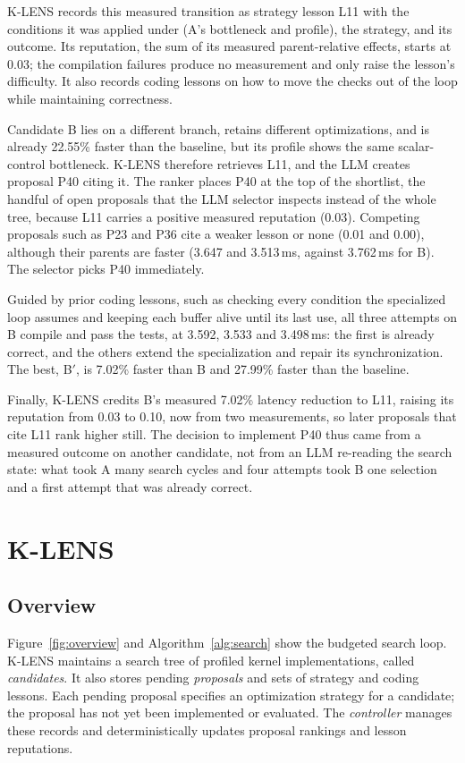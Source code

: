 \documentclass[acmsmall,screen,review,anonymous,nonacm]{acmart}
\newcommand{\klens}{\textsc{K-LENS}\xspace}
\begin{document}
\klens records this measured transition as strategy lesson L11 with the conditions it was applied under (A's
bottleneck and profile), the strategy, and its outcome. Its reputation, the sum of its measured parent-relative effects,
starts at 0.03; the compilation failures produce no measurement and only raise
the lesson's difficulty. It also records coding lessons on how to move the
checks out of the loop while maintaining correctness.

Candidate B lies on a different branch, retains different optimizations, and is
already 22.55\% faster than the baseline, but its profile shows the same
scalar-control bottleneck. \klens therefore retrieves L11, and the LLM creates
proposal P40 citing it. The ranker places P40 at the top of the shortlist, the
handful of open proposals that the LLM selector inspects instead of the whole
tree, because L11 carries a positive measured reputation (0.03). Competing
proposals such as P23 and P36 cite a weaker lesson or none (0.01 and 0.00),
although their parents are faster (3.647 and 3.513\,ms, against 3.762\,ms for
B). The selector picks P40 immediately.

Guided by prior coding lessons, such as checking every condition the
specialized loop assumes and keeping each buffer alive until its last use, all
three attempts on B compile and pass the tests, at 3.592, 3.533 and
3.498\,ms: the first is already correct, and the others extend the
specialization and repair its synchronization. The best, B$'$, is 7.02\%
faster than B and 27.99\% faster than the baseline.

Finally, \klens credits B's measured 7.02\% latency reduction to L11, raising
its reputation from 0.03 to 0.10, now from two measurements, so later proposals
that cite L11 rank higher still. The decision to implement P40 thus came from a
measured outcome on another candidate, not from an LLM re-reading the search
state: what took A many search cycles and four attempts took B one selection
and a first attempt that was already correct.

\section{K-LENS}
\label{sec:approach}

\subsection{Overview}

Figure~\ref{fig:overview} and Algorithm~\ref{alg:search} show the budgeted search
loop. \klens maintains a search tree of profiled kernel implementations,
called \emph{candidates}. It also stores pending \emph{proposals} and sets of
strategy and coding lessons. Each pending proposal specifies an optimization
strategy for a candidate; the proposal has not yet been implemented
or evaluated. The \emph{controller} manages these records and deterministically
updates proposal rankings and lesson reputations.
\end{document}
